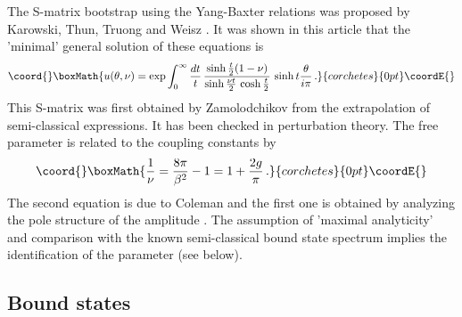 \documentclass[a4paper,12pt]{article}
\begin{document}
The S-matrix bootstrap using the {Yang-Baxter} relations was proposed by
Karowski, Thun, Truong and Weisz \cite{KTTW}. It was shown in this article
that the 'minimal' {general solution} of these equations is 
\[\coord{}\boxMath{
u(\theta ,\nu )=\exp \int_{0}^{\infty }\frac{dt}{t}\,\frac{\sinh \frac{t}{2}%
(1-\nu )}{\sinh \frac{\nu t}{2}\,\cosh \frac{t}{2}}\,\sinh t\frac{\theta }{%
i\pi }\,. 
}{corchetes}{0pt}\coordE{}\]
This S-matrix was first obtained by Zamolodchikov \cite{Za} from the
extrapolation of semi-classical expressions. It has been checked in
perturbation theory. The free parameter \myHighlight{$\nu $}\coordHE{} is related to the coupling
constants by 
\[\coord{}\boxMath{
\frac{1}{\nu }=\frac{8\pi }{\beta ^{2}}-1=1+\frac{2g}{\pi }\,. 
}{corchetes}{0pt}\coordE{}\]
The second equation is due to Coleman and the first one is obtained by
analyzing the pole structure of the amplitude \coordHE{}. The
assumption of 'maximal analyticity' and comparison with the known
semi-classical bound state spectrum implies the identification of the
parameter \myHighlight{$\nu $}\coordHE{} (see below).

\subsection*{Bound states}
\end{document}
